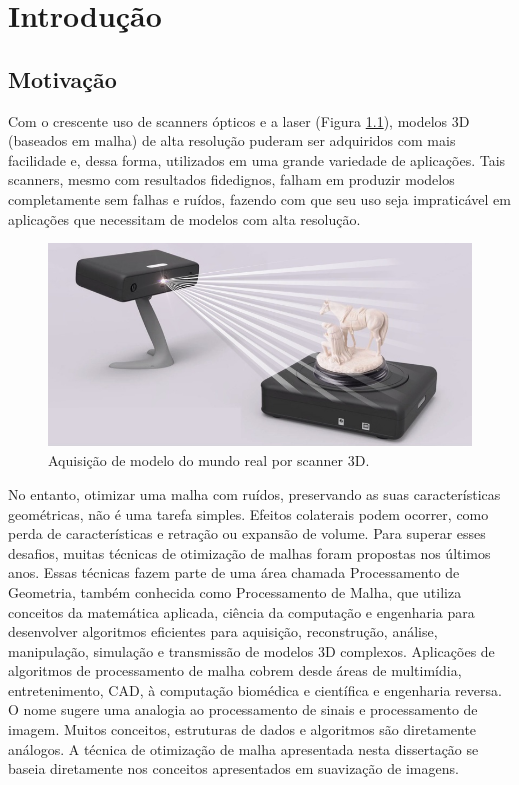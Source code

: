 \chapter{Introdução}
\label{cap:introducao}

\section{Motivação}
Com o crescente uso de scanners ópticos e a laser (Figura \ref{fig:scan3d}), modelos 3D (baseados em malha) de alta resolução puderam ser adquiridos com mais facilidade e, dessa forma, utilizados em uma grande variedade de aplicações. Tais scanners, mesmo com resultados fidedignos, falham em produzir modelos completamente sem falhas e ruídos, fazendo com que seu uso seja impraticável em aplicações que necessitam de modelos com alta resolução.
    
\begin{figure}[!ht]
\captionsetup{width=13cm}
\centering
\includegraphics[scale=0.6]{figuras/scan3d.jpg}
\caption{Aquisição de modelo do mundo real por scanner 3D.}
\label{fig:scan3d}
\end{figure}

No entanto, otimizar uma malha com ruídos, preservando as suas características geométricas, não é uma tarefa simples. Efeitos colaterais podem ocorrer, como perda de características e retração ou expansão de volume. Para superar esses desafios, muitas técnicas de otimização de malhas foram propostas nos últimos anos. Essas técnicas fazem parte de uma área chamada Processamento de Geometria, também conhecida como Processamento de Malha, que utiliza conceitos da matemática aplicada, ciência da computação e engenharia para desenvolver algoritmos eficientes para aquisição, reconstrução, análise, manipulação, simulação e transmissão de modelos 3D complexos. Aplicações de algoritmos de processamento de malha cobrem desde áreas de multimídia, entretenimento, CAD, à computação biomédica e científica e engenharia reversa. O nome sugere uma analogia ao processamento de sinais e processamento de imagem. Muitos conceitos, estruturas de dados e algoritmos são diretamente análogos. A técnica de otimização de malha apresentada nesta dissertação se baseia diretamente nos conceitos apresentados em suavização de imagens.

